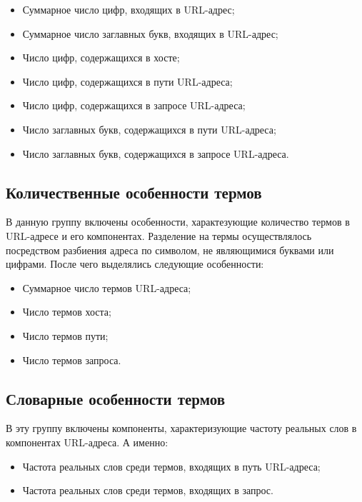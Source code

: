 \begin{itemize}
\item Суммарное число цифр, входящих в URL-адрес;
\item Суммарное число заглавных букв, входящих в URL-адрес;
\item Число цифр, содержащихся в хосте;
\item Число цифр, содержащихся в пути URL-адреса;
\item Число цифр, содержащихся в запросе URL-адреса;
\item Число заглавных букв, содержащихся в пути URL-адреса;
\item Число заглавных букв, содержащихся в запросе URL-адреса.
\end{itemize}

\subsection*{Количественные особенности термов}

В данную группу включены особенности, характезующие количество термов в URL-адресе и его компонентах. Разделение на термы осуществлялось посредством разбиения адреса по символом, не являющимися буквами или цифрами. После чего выделялись следующие особенности:

\begin{itemize}
\item Суммарное число термов URL-адреса;
\item Число термов хоста;
\item Число термов пути;
\item Число термов запроса.
\end{itemize}

\subsection*{Словарные особенности термов}

В эту группу включены компоненты, характеризующие частоту реальных слов в компонентах URL-адреса. А именно:

\begin{itemize}
\item Частота реальных слов среди термов, входящих в путь URL-адреса;
\item Частота реальных слов среди термов, входящих в запрос.
\end{itemize}

